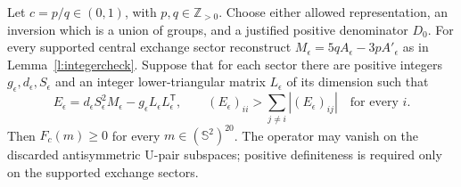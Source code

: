\begin{proposition}\label{p:certificate}
Let \(c=p/q\in(0,1)\), with \(p,q\in\mathbb Z_{>0}\).
Choose either allowed representation, an inversion which is a
union of groups, and a justified positive denominator \(D_0\).
For every supported central exchange sector reconstruct
\(M_\epsilon=5qA_\epsilon-3pA'_\epsilon\) as in
Lemma~\ref{l:integercheck}.
Suppose that for each sector there are positive integers
\(g_\epsilon,d_\epsilon,S_\epsilon\) and an integer lower-triangular
matrix \(L_\epsilon\) of its dimension such that
\[
 E_\epsilon=d_\epsilon S_\epsilon^2M_\epsilon
                  -g_\epsilon L_\epsilon L_\epsilon^{\mathsf T},
 \qquad
 (E_\epsilon)_{ii}>
          \sum_{j\ne i}|(E_\epsilon)_{ij}|\quad\text{for every }i.
\]
Then \(F_c(m)\ge0\) for every \(m\in(\mathbb S^2)^{20}\).
The operator may vanish on the discarded antisymmetric
\(\mathrm U\)-pair subspaces; positive definiteness is required
only on the supported exchange sectors.
\end{proposition}

